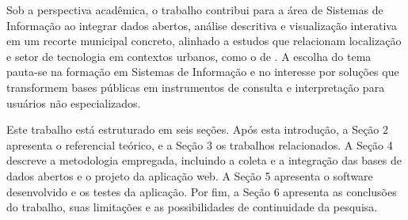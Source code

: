 Sob a perspectiva acadêmica, o trabalho contribui para a área de Sistemas de Informação ao integrar dados abertos, análise descritiva e visualização interativa em um recorte municipal concreto, alinhado a estudos que relacionam localização e setor de tecnologia em contextos urbanos, como o de .
A escolha do tema pauta-se na formação em Sistemas de Informação e no interesse por soluções que transformem bases públicas em instrumentos de consulta e interpretação para usuários não especializados.

Este trabalho está estruturado em seis seções.
Após esta introdução, a Seção 2 apresenta o referencial teórico, e a Seção 3 os trabalhos relacionados.
A Seção 4 descreve a metodologia empregada, incluindo a coleta e a integração das bases de dados abertos e o projeto da aplicação web.
A Seção 5 apresenta o software desenvolvido e os testes da aplicação.
Por fim, a Seção 6 apresenta as conclusões do trabalho, suas limitações e as possibilidades de continuidade da pesquisa.
